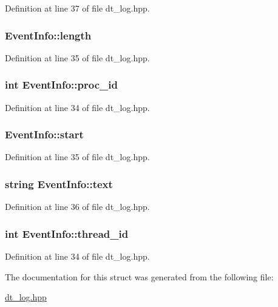 Definition at line 37 of file dt\_\-log.hpp.\hypertarget{struct_event_info_a00c0cfb6e7ef3c3568bbe468402d353f}{
\subsubsection[{length}]{ {\bf EventInfo::length}}}
\label{struct_event_info_a00c0cfb6e7ef3c3568bbe468402d353f}


Definition at line 35 of file dt\_\-log.hpp.\hypertarget{struct_event_info_a65d96a908240a3ac80f295eed7332d81}{
\subsubsection[{proc\_\-id}]{\setlength{\rightskip}{0pt plus 5cm}int {\bf EventInfo::proc\_\-id}}}
\label{struct_event_info_a65d96a908240a3ac80f295eed7332d81}


Definition at line 34 of file dt\_\-log.hpp.\hypertarget{struct_event_info_a0f8f907ac1f04d3efc98872b902e44c0}{
\subsubsection[{start}]{ {\bf EventInfo::start}}}
\label{struct_event_info_a0f8f907ac1f04d3efc98872b902e44c0}


Definition at line 35 of file dt\_\-log.hpp.\hypertarget{struct_event_info_a3e78c5448e4dfaaa57fde573ca25a225}{
\subsubsection[{text}]{\setlength{\rightskip}{0pt plus 5cm}string {\bf EventInfo::text}}}
\label{struct_event_info_a3e78c5448e4dfaaa57fde573ca25a225}


Definition at line 36 of file dt\_\-log.hpp.\hypertarget{struct_event_info_a09d5979b078cc79e25ba12bdb14118a8}{
\subsubsection[{thread\_\-id}]{\setlength{\rightskip}{0pt plus 5cm}int {\bf EventInfo::thread\_\-id}}}
\label{struct_event_info_a09d5979b078cc79e25ba12bdb14118a8}


Definition at line 34 of file dt\_\-log.hpp.

The documentation for this struct was generated from the following file:\begin{DoxyCompactItemize}
\item 
\hyperlink{dt__log_8hpp}{dt\_\-log.hpp}\end{DoxyCompactItemize}
